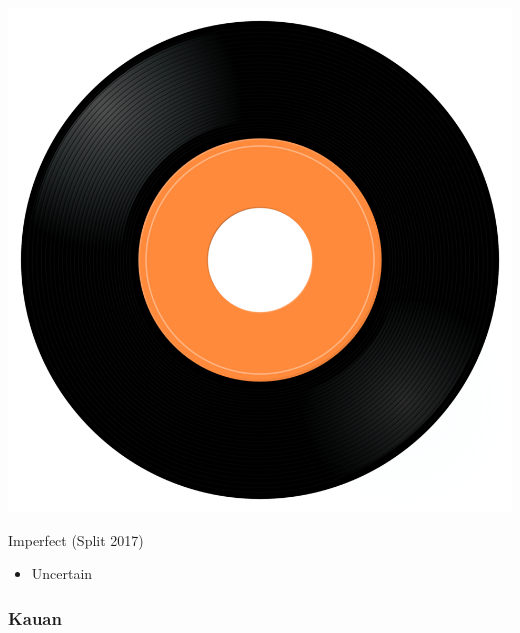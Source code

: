 \begin{minipage}[t]{0.25\textwidth}
\captionsetup{type=figure}
\includegraphics[width=\textwidth]{Images/cover.png}
\caption*{Imperfect (Split 2017)}
\end{minipage}
\begin{minipage}[t]{0.25\textwidth}\vspace{0pt}
\begin{itemize}[nosep,leftmargin=1em,labelwidth=*,align=left]
	\setlength{\itemsep}{0pt}
	\item Uncertain
\end{itemize}
\end{minipage}

\subsubsection{Kauan}

